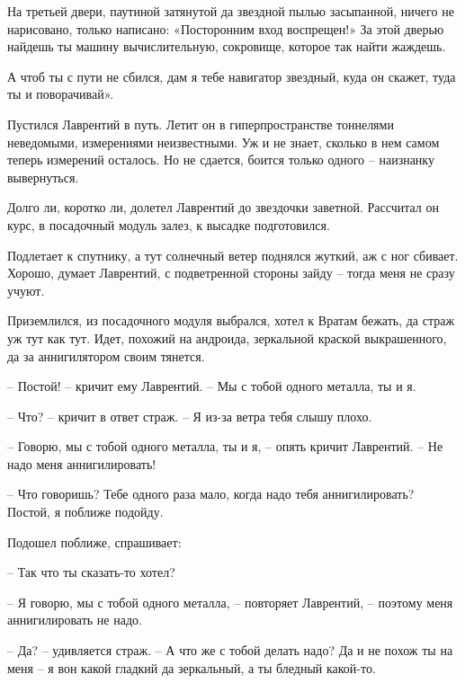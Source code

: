 \documentclass[ebook,oneside,final,openright]{memoir}
\begin{document}
\par
На третьей двери, паутиной затянутой да звездной пылью засыпанной, ничего не нарисовано, только написано: «Посторонним вход воспрещен!» За этой дверью найдешь ты машину вычислительную, сокровище, которое так найти жаждешь.\par
\par
А чтоб ты с пути не сбился, дам я тебе навигатор звездный, куда он скажет, туда ты и поворачивай».\par
\par
Пустился Лаврентий в путь. Летит он в гиперпространстве тоннелями неведомыми, измерениями неизвестными. Уж и не знает, сколько в нем самом теперь измерений осталось. Но не сдается, боится только одного – наизнанку вывернуться.\par
\par
Долго ли, коротко ли, долетел Лаврентий до звездочки заветной. Рассчитал он курс, в посадочный модуль залез, к высадке подготовился.\par
\par
Подлетает к спутнику, а тут солнечный ветер поднялся жуткий, аж с ног сбивает. Хорошо, думает Лаврентий, с подветренной стороны зайду – тогда меня не сразу учуют. \par
\par
 Приземлился, из посадочного модуля выбрался, хотел к Вратам бежать, да страж уж тут как тут. Идет, похожий на андроида, зеркальной краской выкрашенного, да за аннигилятором своим тянется. \par
 \par
– Постой! – кричит ему Лаврентий. – Мы с тобой одного металла, ты и я. \par
– Что? – кричит в ответ страж. – Я из-за ветра тебя слышу плохо. \par
– Говорю, мы с тобой одного металла, ты и я, – опять кричит Лаврентий. – Не надо меня аннигилировать!\par
– Что говоришь? Тебе одного раза мало, когда надо тебя аннигилировать? Постой, я поближе подойду. \par
Подошел поближе, спрашивает: \par
– Так что ты сказать-то хотел? \par
– Я говорю, мы с тобой одного металла, – повторяет Лаврентий, – поэтому меня аннигилировать не надо. \par
– Да? – удивляется страж. – А что же с тобой делать надо? Да и не похож ты на меня – я вон какой гладкий да зеркальный, а ты бледный какой-то. \par
\end{document}
